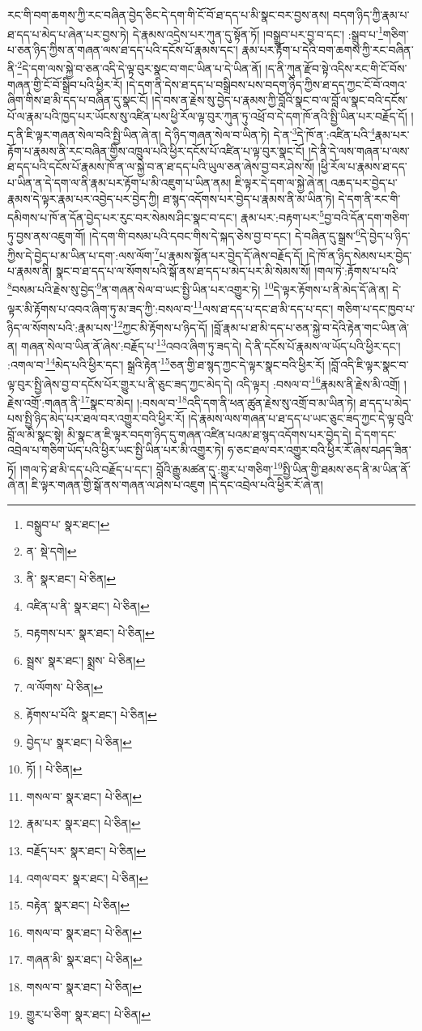རང་གི་བག་ཆགས་ཀྱི་རང་བཞིན་བྱེད་ཅིང་དེ་དག་གི་ངོ་བོ་ཐ་དད་པ་མི་སྣང་བར་བྱས་ནས། བདག་ཉིད་ཀྱི་རྣམ་པ་ཐ་དད་པ་མེད་པ་ཞེན་པར་བྱས་ཏེ། དེ་རྣམས་འདྲེས་པར་ཀུན་དུ་སྟོན་ཏོ། །བསྒྲུབ་པར་བྱ་བ་དང་། :སྒྲུབ་པ་\footnote{བསྒྲུབ་པ་  སྣར་ཐང་། }གཅིག་པ་ཅན་ཉིད་ཀྱིས་ན་གཞན་ལས་ཐ་དད་པའི་དངོས་པོ་རྣམས་དང་། རྣམ་པར་རྟོག་པ་དེའི་བག་ཆགས་ཀྱི་རང་བཞིན་ནི་\footnote{ན་  སྡེ་དགེ། }དེ་དག་ལས་སྐྱེ་བ་ཅན་འདི་དེ་ལྟ་བུར་སྣང་བ་གང་ཡིན་པ་དེ་ཡིན་ནོ། །ད་ནི་ཀུན་རྫོབ་སྟེ་འདིས་རང་གི་ངོ་བོས་གཞན་གྱི་ངོ་བོ་སྒྲིབ་པའི་ཕྱིར་རོ། །དེ་དག་ནི་དེས་ཐ་དད་པ་བསྒྲིབས་པས་བདག་ཉིད་ཀྱིས་ཐ་དད་ཀྱང་ངོ་བོ་འགའ་ཞིག་གིས་ཐ་མི་དད་པ་བཞིན་དུ་སྣང་ངོ། །དེ་བས་ན་རྗེས་སུ་བྱེད་པ་རྣམས་ཀྱི་བློའི་སྣང་བ་ལ་བློ་ལ་སྣང་བའི་དངོས་པོ་ལ་རྣམ་པའི་ཁྱད་པར་ཡོངས་སུ་འཛིན་པས་ཕྱི་རོལ་ལྟ་བུར་ཀུན་ཏུ་འཕྲོ་བ་དེ་དག་ཁོ་ནའི་སྤྱི་ཡིན་པར་བརྗོད་དོ། །ད་ནི་ཇི་ལྟར་གཞན་སེལ་བའི་སྤྱི་ཡིན་ཞེ་ན། དེ་ཉིད་གཞན་སེལ་བ་ཡིན་ཏེ། དེ་ན་\footnote{ནི་  སྣར་ཐང་།  པེ་ཅིན། }དེ་ཁོ་ན་:འཛིན་པའི་\footnote{འཛིན་པ་ནི་  སྣར་ཐང་།  པེ་ཅིན། }རྣམ་པར་རྟོག་པ་རྣམས་ནི་རང་བཞིན་གྱིས་འཁྲུལ་པའི་ཕྱིར་དངོས་པོ་འཛིན་པ་ལྟ་བུར་སྣང་ངོ། །དེ་ནི་དེ་ལས་གཞན་པ་ལས་ཐ་དད་པའི་དངོས་པོ་རྣམས་ཁོ་ན་ལ་སྐྱེ་བ་ན་ཐ་དད་པའི་ཡུལ་ཅན་ཞེས་བྱ་བར་ཤེས་སོ། །ཕྱི་རོལ་པ་རྣམས་ཐ་དད་པ་ཡིན་ན་དེ་དག་ལ་ནི་རྣམ་པར་རྟོག་པ་མི་འཇུག་པ་ཡིན་ནམ། ཇི་ལྟར་དེ་དག་ལ་སྐྱེ་ཞེ་ན། འཆད་པར་བྱེད་པ་རྣམས་དེ་ལྟར་རྣམ་པར་འབྱེད་པར་བྱེད་ཀྱི། ཐ་སྙད་འདོགས་པར་བྱེད་པ་རྣམས་ནི་མ་ཡིན་ཏེ། དེ་དག་ནི་རང་གི་དམིགས་པ་ཁོ་ན་དོན་བྱེད་པར་རུང་བར་སེམས་ཤིང་སྣང་བ་དང་། རྣམ་པར་:བརྟག་པར་\footnote{བརྟགས་པར་  སྣར་ཐང་།  པེ་ཅིན། }བྱ་བའི་དོན་དག་གཅིག་ཏུ་བྱས་ནས་འཇུག་གོ། །དེ་དག་གི་བསམ་པའི་དབང་གིས་དེ་སྐད་ཅེས་བྱ་བ་དང་། དེ་བཞིན་དུ་སྒྲས་\footnote{སྦྲས་  སྣར་ཐང་། སྨྲས་  པེ་ཅིན། }དེ་བྱེད་པ་ཉིད་ཀྱིས་དེ་བྱེད་པ་མ་ཡིན་པ་དག་:ལས་ལོག་\footnote{ལ་ལོགས་  པེ་ཅིན། }པ་རྣམས་སྟོན་པར་བྱེད་དོ་ཞེས་བརྗོད་དོ། །དེ་ཁོ་ན་ཉིད་སེམས་པར་བྱེད་པ་རྣམས་ནི། སྣང་བ་ཐ་དད་པ་ལ་སོགས་པའི་སྒོ་ནས་ཐ་དད་པ་མེད་པར་མི་སེམས་སོ། །གལ་ཏེ་:རྟོགས་པ་པའི་\footnote{རྟོགས་པ་པོའི་  སྣར་ཐང་།  པེ་ཅིན། }བསམ་པའི་རྗེས་སུ་བྱེད་\footnote{བྱེད་པ་  སྣར་ཐང་།  པེ་ཅིན། }ན་གཞན་སེལ་བ་ཡང་སྤྱི་ཡིན་པར་འགྱུར་ཏེ། \footnote{ཏོ། །   པེ་ཅིན། }དེ་ལྟར་རྟོགས་པ་ནི་མེད་དོ་ཞེ་ན། དེ་ལྟར་མི་རྟོགས་པ་འབའ་ཞིག་ཏུ་མ་ཟད་ཀྱི་:བསལ་བ་\footnote{གསལ་བ་  སྣར་ཐང་།  པེ་ཅིན། }ལས་ཐ་དད་པ་དང་ཐ་མི་དད་པ་དང་། གཅིག་པ་དང་ཁྱབ་པ་ཉིད་ལ་སོགས་པའི་:རྣམ་པས་\footnote{རྣམ་པར་  སྣར་ཐང་།  པེ་ཅིན། }ཀྱང་མི་རྟོགས་པ་ཉིད་དོ། །བློ་རྣམ་པ་ཐ་མི་དད་པ་ཅན་སྐྱེ་བ་དེའི་རྟེན་གང་ཡིན་ཞེ་ན། གཞན་སེལ་བ་ཡིན་ནོ་ཞེས་:བརྗོད་པ་\footnote{བརྗོད་པར་  སྣར་ཐང་།  པེ་ཅིན། }འབའ་ཞིག་ཏུ་ཟད་དེ། དེ་ནི་དངོས་པོ་རྣམས་ལ་ཡོད་པའི་ཕྱིར་དང་། :འགལ་བ་\footnote{འགལ་བར་  སྣར་ཐང་།  པེ་ཅིན། }མེད་པའི་ཕྱིར་དང་། སྒྲའི་རྟེན་\footnote{བརྟེན་  སྣར་ཐང་།  པེ་ཅིན། }ཅན་གྱི་ཐ་སྙད་ཀྱང་དེ་ལྟར་སྣང་བའི་ཕྱིར་རོ། །བློ་འདི་ཇི་ལྟར་སྣང་བ་ལྟ་བུར་སྤྱི་ཞེས་བྱ་བ་དངོས་པོར་གྱུར་པ་ནི་ཅུང་ཟད་ཀྱང་མེད་དེ། འདི་ལྟར། :བསལ་བ་\footnote{གསལ་བ་  སྣར་ཐང་།  པེ་ཅིན། }རྣམས་ནི་རྗེས་མི་འགྲོ། །རྗེས་འགྲོ་:གཞན་ནི་\footnote{གཞན་མི་  སྣར་ཐང་།  པེ་ཅིན། }སྣང་བ་མེད། །:བསལ་བ་\footnote{གསལ་བ་  སྣར་ཐང་།  པེ་ཅིན། }འདི་དག་ནི་ཕན་ཚུན་རྗེས་སུ་འགྲོ་བ་མ་ཡིན་ཏེ། ཐ་དད་པ་མེད་པས་སྤྱི་ཉིད་མེད་པར་ཐལ་བར་འགྱུར་བའི་ཕྱིར་རོ། །དེ་རྣམས་ལས་གཞན་པ་ཐ་དད་པ་ཡང་ཅུང་ཟད་ཀྱང་དེ་ལྟ་བུའི་བློ་ལ་མི་སྣང་སྟེ། མི་སྣང་ན་ཇི་ལྟར་བདག་ཉིད་དུ་གཞན་འཛིན་པའམ་ཐ་སྙད་འདོགས་པར་བྱེད་དེ། དེ་དག་དང་འབྲེལ་པ་གཅིག་ཡོད་པའི་ཕྱིར་ཡང་སྤྱི་ཡིན་པར་མི་འགྱུར་ཏེ། ཧ་ཅང་ཐལ་བར་འགྱུར་བའི་ཕྱིར་རོ་ཞེས་བཤད་ཟིན་ཏོ། །གལ་ཏེ་ཐ་མི་དད་པའི་བརྗོད་པ་དང་། བློའི་རྒྱུ་མཚན་དུ་:གྱུར་པ་གཅིག་\footnote{གྱུར་པ་ཅིག་  སྣར་ཐང་།  པེ་ཅིན། }སྤྱི་ཡིན་གྱི་ཐམས་ཅད་ནི་མ་ཡིན་ནོ་ཞེ་ན། ཇི་ལྟར་གཞན་གྱི་སྒོ་ནས་གཞན་ལ་ཤེས་པ་འཇུག །དེ་དང་འབྲེལ་པའི་ཕྱིར་རོ་ཞེ་ན། 